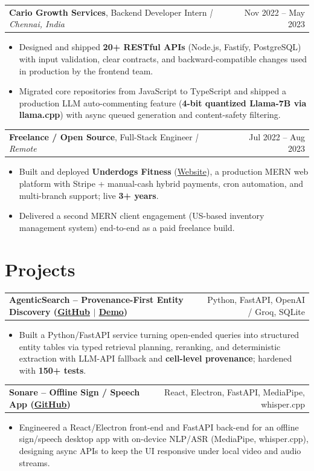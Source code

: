 \documentclass[letterpaper,11pt]{article}
\makeatletter
\newcommand{\expItem}[4]{%
  \vspace{2pt}
  \begin{tabular*}{\textwidth}{@{}l@{\extracolsep{\fill}}r@{}}
    \textbf{#1}, #2 \textit{| #3} & #4 \\
  \end{tabular*}\par\vspace{-2pt}
}
\newcommand{\projItem}[2]{%
  \vspace{4pt}
  \begin{tabular*}{\textwidth}{@{}l@{\extracolsep{\fill}}r@{}}
    \textbf{#1} & #2 \\
  \end{tabular*}\par\vspace{-2pt}
}
\makeatother
\begin{document}
\expItem{Cario Growth Services}{Backend Developer Intern}{Chennai, India}{Nov 2022 -- May 2023}
\begin{itemize}
  \item Designed and shipped \textbf{20+ RESTful APIs} (Node.js, Fastify, PostgreSQL) with input validation, clear contracts, and backward-compatible changes used in production by the frontend team.
  \item Migrated core repositories from JavaScript to TypeScript and shipped a production LLM auto-commenting feature (\textbf{4-bit quantized Llama-7B via llama.cpp}) with async queued generation and content-safety filtering.
\end{itemize}

\expItem{Freelance / Open Source}{Full-Stack Engineer}{Remote}{Jul 2022 -- Aug 2023}
\begin{itemize}
  \item Built and deployed \textbf{Underdogs Fitness} (\href{https://www.underdogsfitness.in/}{Website}), a production MERN web platform with Stripe + manual-cash hybrid payments, cron automation, and multi-branch support; live \textbf{3+ years}.
  \item Delivered a second MERN client engagement (US-based inventory management system) end-to-end as a paid freelance build.
\end{itemize}

\section{Projects}

\projItem{AgenticSearch -- Provenance-First Entity Discovery {\normalfont\small(\href{https://github.com/Deva-1903/ciir_agentic_search}{GitHub} $\vert$ \href{https://agentic-search-negglszkwa-uc.a.run.app}{Demo})}}{Python, FastAPI, OpenAI / Groq, SQLite}
\begin{itemize}
  \item Built a Python/FastAPI service turning open-ended queries into structured entity tables via typed retrieval planning, reranking, and deterministic extraction with LLM-API fallback and \textbf{cell-level provenance}; hardened with \textbf{150+ tests}.
\end{itemize}

\projItem{Sonare -- Offline Sign / Speech App {\normalfont\small(\href{https://github.com/Deva-1903/Qualcomm-Sep25-Team-Sonare}{GitHub})}}{React, Electron, FastAPI, MediaPipe, whisper.cpp}
\begin{itemize}
  \item Engineered a React/Electron front-end and FastAPI back-end for an offline sign/speech desktop app with on-device NLP/ASR (MediaPipe, whisper.cpp), designing async APIs to keep the UI responsive under local video and audio streams.
\end{itemize}
\end{document}
